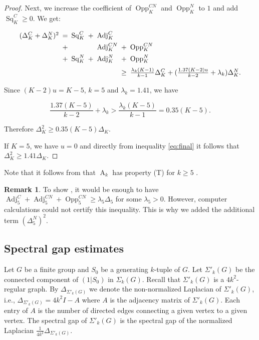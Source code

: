 \documentclass[12pt]{amsart}
\theoremstyle{definition}
\newtheorem{remark}[theorem]{Remark}
\numberwithin{figure}{section}
\numberwithin{table}{section}
\numberwithin{equation}{section}
\newcommand{\A}{\operatorname{A}}
\newcommand{\Adj}{\operatorname{Adj}}
\newcommand{\Sq}{\operatorname{Sq}}
\newcommand{\Opp}{\operatorname{Opp}}
\begin{document}
\begin{proof}
Next, we increase the coefficient of $\Opp^{CN}_K$ and $\Opp^N_K$ to $1$ and add $\Sq_K^C \geq 0$. We get:


\begin{equation}
\begin{array}{r@{\hskip 5pt}c@{\hskip 5pt}l@{\hskip 5pt}l@{\hskip 5pt}l@{\hskip 5pt}r@{\hskip 5pt}l}
(\Delta_K^C+\Delta_K^N)^2 & = &\Sq_K^C&+&\Adj_K^{C}\\[0.4em]
&+&&&\Adj_K^{CN}  & + &\Opp_K^{CN} \\[0.4em]
&+& \Sq_K^{N}   & + & \Adj_K^{N}&+&\Opp_K^{N} \\[0.6em]
&&& && \geq&  \frac{\lambda_k (K-1)}{k-1}\Delta_K^C + (\frac{1.37 (K-2)u}{k-2}+\lambda_k)\Delta_K^N.
\end{array}
\label{eq:final}
\end{equation}

Since $(K-2)u = K-5$, $k = 5$ and $\lambda_k = 1.41$, we have 

$$
\frac{1.37(K-5)}{k-2}+\lambda_k > \frac{\lambda_k(K-5)}{k-1} = 0.35(K-5).
$$ 

Therefore $\Delta_K^2 \geq 0.35(K-5)\Delta_K$.

If $K=5$, we have $u=0$ and directly from inequality \ref{eq:final} it follows that $\Delta^2_K \geq 1.41\Delta_K$. 

\end{proof}

Note that it follows from  that $\A_k$ has property (T) for $k\geq 5$ \cite{MR3427595}.

\begin{remark}
To show , it would be enough to have $\Adj_5^C + \Adj_5^{CN} + \Opp_5^{CN} \geq \lambda_5\Delta_5$ for some $\lambda_5>0$. However, computer calculations could not certify this inequality. This is why we added the additional term $(\Delta_5^N)^2$.
\end{remark}

\subsection{Spectral gap estimates}\label{ss:convergence}

Let $G$ be a finite group and $S_0$ be a generating $k$-tuple of $G$. Let $\Sigma'_k(G)$ be the connected component of $(1|S_0)$ in $\Sigma_k(G)$. Recall that $\Sigma'_k(G)$ is a $4k^2$-regular graph. By  $\Delta_{\Sigma'_k(G)}$ we denote the non-normalized Laplacian of $\Sigma'_k(G)$, i.e., $\Delta_{\Sigma'_k(G)} = 4k^2I - A$ where $A$ is the adjacency matrix of $\Sigma'_k(G)$. Each entry of $A$ is the number of directed edges connecting a given vertex to a given vertex. The spectral gap of $\Sigma'_k(G)$ is the spectral gap of the normalized Laplacian $\frac{1}{4k^2}\Delta_{\Sigma'_k(G)}$.
\end{document}
